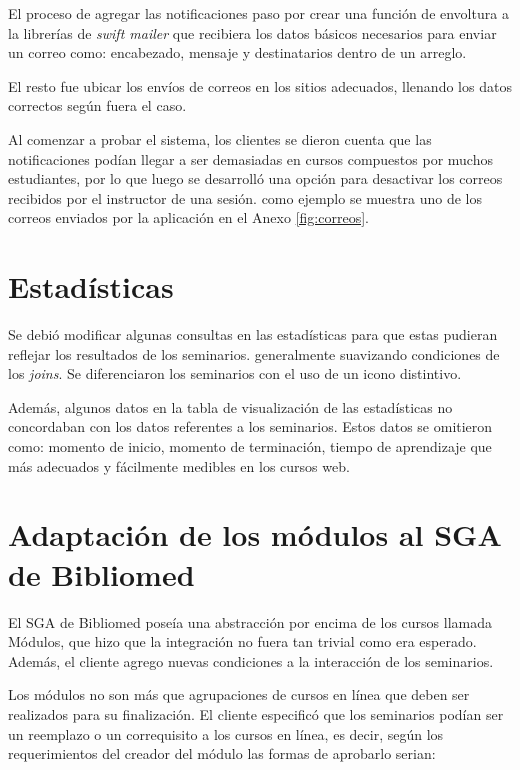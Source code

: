 	El proceso de agregar las notificaciones paso por crear una función de envoltura a la librerías de \emph{swift mailer} que recibiera los datos básicos necesarios para enviar un correo como: encabezado, mensaje y destinatarios dentro de un arreglo.

	El resto fue ubicar los envíos de correos en los sitios adecuados, llenando los datos correctos según fuera el caso.

	Al comenzar a probar el sistema, los clientes se dieron cuenta que las notificaciones podían llegar a ser demasiadas en cursos compuestos por muchos estudiantes, por lo que luego se desarrolló una opción para desactivar los correos recibidos por el instructor de una sesión. como ejemplo se muestra uno de los correos enviados por la aplicación en el Anexo \ref{fig:correos}.

	\section{Estadísticas} %
	\label{sec:estadisticas}
	
	Se debió modificar algunas consultas en las estadísticas para que estas pudieran reflejar los resultados de los seminarios. generalmente suavizando condiciones de los \emph{joins}. Se diferenciaron los seminarios con el uso de un icono distintivo.

	Además, algunos datos en la tabla de visualización de las estadísticas no concordaban con los datos referentes a los seminarios. Estos datos se omitieron como: momento de inicio, momento de terminación, tiempo de aprendizaje que más adecuados y fácilmente medibles en los cursos web.

	\section{Adaptación de los módulos al SGA de Bibliomed} %
	\label{sec:adaptacion_de_los_modulos_al_sga_de_bibliomed}
	
	El SGA de Bibliomed poseía una abstracción por encima de los cursos llamada Módulos, que hizo que la integración no fuera tan trivial como era esperado. Además, el cliente agrego nuevas condiciones a la interacción de los seminarios.

	Los módulos no son más que agrupaciones de cursos en línea que deben ser realizados para su finalización. El cliente especificó que los seminarios podían ser un reemplazo o un correquisito a los cursos en línea, es decir, según los requerimientos del creador del módulo las formas de aprobarlo serian:

